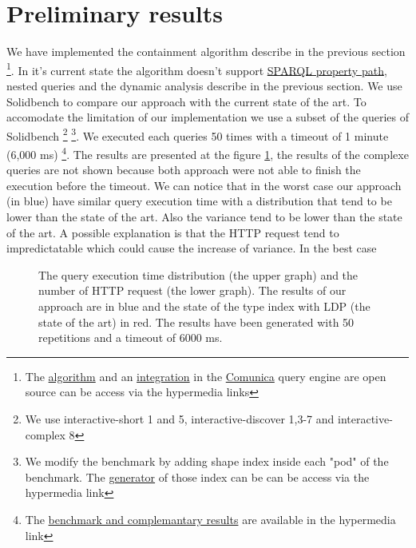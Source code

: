 \section{Preliminary results}
We have implemented the containment algorithm describe in the previous section 
\footnote{The \href{https://github.com/constraintAutomaton/query-shape-detection}{algorithm} and an 
\href{https://github.com/constraintAutomaton/comunica-feature-link-traversal/tree/feature/shapeIndex}{integration} 
in the \href{https://github.com/comunica/comunica}{Comunica} query engine are open source can be access via the hypermedia links}.
In it's current state the algorithm doesn't support \href{https://www.w3.org/TR/sparql11-query/#propertypaths}{SPARQL property path}, nested queries
and the dynamic analysis describe in the previous section. 
We use Solidbench \cite{Taelman2023} to compare our approach with the current state of the art.
To accomodate the limitation of our implementation we use a subset of the queries of Solidbench
\footnote{ We use interactive-short 1 and 5, interactive-discover 1,3-7 and interactive-complex 8}
\footnote{We modify the benchmark by adding shape index inside each "pod" of the benchmark.
The \href{https://github.com/constraintAutomaton/rdf-dataset-fragmenter.js/tree/feature/shapeIndex}{generator} of those index can be  can be access via the hypermedia link
}.
We executed each queries 50 times with a timeout of 1 minute (6,000 ms) 
\footnote{The \href{https://github.com/constraintAutomaton/amw_shape_index_results}{benchmark and complemantary results} are available in the hypermedia link}.
The results are presented at the figure \ref{fig:result}, the results of the complexe queries are not shown because both approach 
were not able to finish the execution before the timeout.
We can notice that in the worst case our approach (in blue) have similar query execution time with a distribution that tend to be
lower than the state of the art. Also the variance tend to be lower than the state of the art. 
A possible explanation is that the HTTP request tend to impredictatable which could cause the increase of variance.
In the best case 

\begin{figure}[ht]
    
    \caption{The query execution time distribution (the upper graph) and the number of HTTP request (the lower graph).
    The results of our approach are in blue and the state of the type index with LDP (the state of the art) in red.
    The results have been generated with 50 repetitions and a timeout of 6000 ms. 
    }
    \label{fig:result}
\end{figure}
  